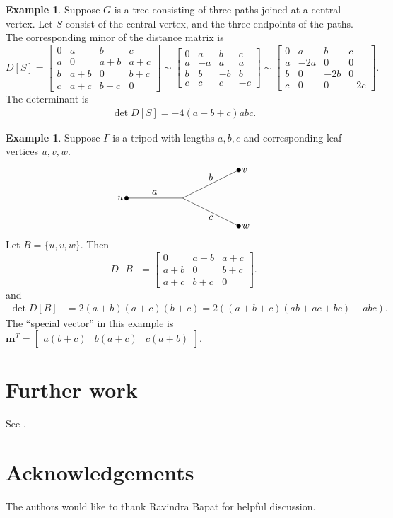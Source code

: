 \documentclass{amsart}
\theoremstyle{definition}
\newtheorem{eg}[thm]{Example}
\begin{document}
\begin{eg}
Suppose $G$ is a tree consisting of three paths joined at a central vertex.
Let $S$ consist of the central vertex, and the three endpoints of the paths. 
The corresponding minor of the distance matrix is
$$
D[S] = \begin{bmatrix}
0 & a & b & c \\
a & 0 & a + b & a + c \\
b & a + b & 0 & b + c \\
c & a + c & b + c & 0
\end{bmatrix}
\sim \begin{bmatrix}
0 & a & b & c \\
a & -a & a  & a \\
b & b & -b & b \\
c & c & c & -c
\end{bmatrix}
\sim \begin{bmatrix}
0 & a & b & c \\
a & -2a & 0 & 0 \\
b & 0 & -2b & 0 \\
c & 0 & 0 & -2c
\end{bmatrix}.
$$
The determinant is
\begin{align*}
\det D[S] 
= -4(a+b+c)abc.
\end{align*}
\end{eg}

\begin{eg}
Suppose $\Gamma$ is a tripod with lengths $a,b,c$ and corresponding leaf vertices $u,v,w$.
\[
\begin{tikzpicture}
	\draw (0,0) -- (-2,0);
	\draw (2,1) -- (0,0) -- (2,-1);
	\filldraw[black] (-2,0) circle (2pt);
	\filldraw[black] (2,1) circle (2pt);
	\filldraw[black] (2,-1) circle (2pt);

	\node[above] at (-1,0) {$a$};
	\node[above] at (1,0.5) {$b$};
	\node[below] at (1,-0.5) {$c$};

	\node[left] at (-2,0) {$u$};
	\node[right] at (2,1) {$v$};
	\node[right] at (2,-1) {$w$};
\end{tikzpicture}
\]
Let $B = \{u,v,w\}$.
Then 
$$
D[B] = \begin{bmatrix}
0 & a + b & a + c \\
a + b & 0 & b + c \\
a + c & b + c & 0
\end{bmatrix}.
$$
and
\begin{align*}
\det D[B] &= 2(a+b)(a+c)(b+c) 
= 2\left( (a+b+c)(ab + ac + bc) - abc \right).
\end{align*}
The ``special vector'' in this example is $\mathbf{m}^T = \begin{bmatrix} a(b + c) & b(a + c) & c(a + b) \end{bmatrix}$.
\end{eg}

\section{Further work}

See \cite{richman-shokrieh-wu}.

\section*{Acknowledgements}
The authors would like to thank Ravindra Bapat for helpful discussion.


 

\end{document}
